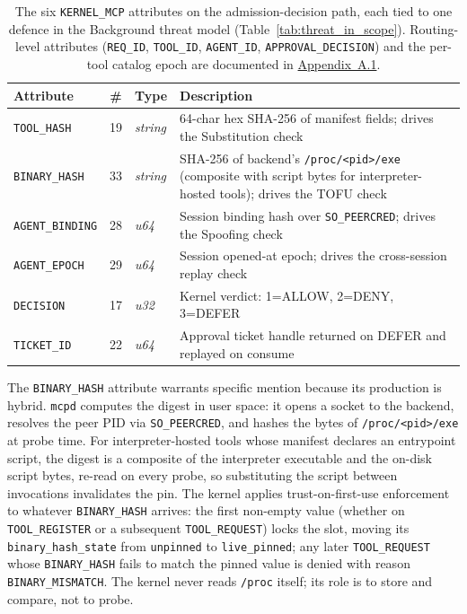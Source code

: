 \begin{table}[!t]
\centering
\caption{The six \texttt{KERNEL\_\allowbreak MCP} attributes on the admission-decision path, each tied to one defence in the Background threat model (Table~\ref{tab:threat_in_scope}). Routing-level attributes (\texttt{REQ\_ID}, \texttt{TOOL\_ID}, \texttt{AGENT\_ID}, \texttt{APPROVAL\_\allowbreak DECISION}) and the per-tool catalog epoch are documented in \hyperref[sec:appendix-protocols]{Appendix~A.1}.}
\label{tab:netlink-attrs}
\footnotesize
\setlength{\tabcolsep}{4pt}\renewcommand{\arraystretch}{1.0}
\begin{tabular}{@{}lcl p{5.8cm}@{}}
\toprule
\textbf{Attribute} & \textbf{\#} & \textbf{Type} & \textbf{Description} \\
\midrule
\texttt{TOOL\_HASH}             & 19 & \textit{string} & 64-char hex SHA-256 of manifest fields; drives the Substitution check \\
\texttt{BINARY\_\allowbreak HASH}       & 33 & \textit{string} & SHA-256 of backend's \texttt{/proc/<pid>/exe} (composite with script bytes for interpreter-hosted tools); drives the TOFU check \\
\texttt{AGENT\_\allowbreak BINDING}     & 28 & \textit{u64}    & Session binding hash over \texttt{SO\_\allowbreak PEERCRED}; drives the Spoofing check \\
\texttt{AGENT\_\allowbreak EPOCH}       & 29 & \textit{u64}    & Session opened-at epoch; drives the cross-session replay check \\
\texttt{DECISION}               & 17 & \textit{u32}    & Kernel verdict: 1=ALLOW, 2=DENY, 3=DEFER \\
\texttt{TICKET\_ID}             & 22 & \textit{u64}    & Approval ticket handle returned on DEFER and replayed on consume \\
\bottomrule
\end{tabular}
\end{table}

The \texttt{BINARY\_\allowbreak HASH} attribute warrants specific mention because its production is hybrid.
\texttt{mcpd} computes the digest in user space: it opens a socket to the backend, resolves the peer PID via \texttt{SO\_\allowbreak PEERCRED}, and hashes the bytes of \texttt{/\allowbreak proc/\allowbreak <pid>/\allowbreak exe} at probe time.
For interpreter-hosted tools whose manifest declares an entrypoint script, the digest is a composite of the interpreter executable and the on-disk script bytes, re-read on every probe, so substituting the script between invocations invalidates the pin.
The kernel applies trust-on-first-use enforcement to whatever \texttt{BINARY\_\allowbreak HASH} arrives: the first non-empty value (whether on \texttt{TOOL\_\allowbreak REGISTER} or a subsequent \texttt{TOOL\_\allowbreak REQUEST}) locks the slot, moving its \texttt{binary\_\allowbreak hash\_\allowbreak state} from \texttt{unpinned} to \texttt{live\_\allowbreak pinned}; any later \texttt{TOOL\_\allowbreak REQUEST} whose \texttt{BINARY\_\allowbreak HASH} fails to match the pinned value is denied with reason \texttt{BINARY\_\allowbreak MISMATCH}.
The kernel never reads \texttt{/proc} itself; its role is to store and compare, not to probe.

